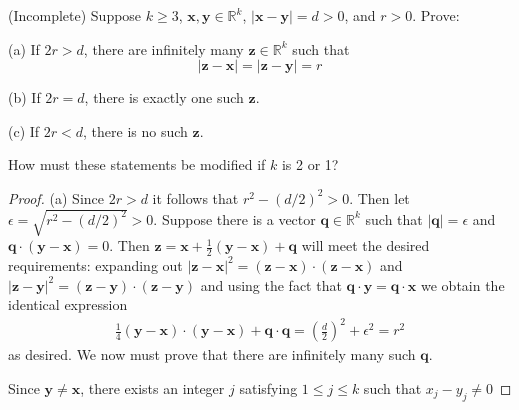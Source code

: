 \documentclass[12pt]{article}
\newenvironment{problem}[2][Problem]{\begin{trivlist}
\item[\hskip \labelsep {\bfseries #1}\hskip \labelsep {\bfseries #2.}]}{\end{trivlist}}
\begin{document}
\begin{problem}{9}

\end{problem}
\begin{problem}{10}

\end{problem}
\begin{problem}{11}

\end{problem}
\begin{problem}{12}

\end{problem}
\begin{problem}{13}

\end{problem}
\begin{problem}{14}

\end{problem}
\begin{problem}{15}

\end{problem}
\begin{problem}{16}
(Incomplete) Suppose $k \geq 3$, $\mathbf{x},\mathbf{y} \in \mathbb{R}^k$, $|\mathbf{x}-\mathbf{y}| = d > 0$, and $r > 0$.  Prove:

(a) If $2r > d$, there are infinitely many $\mathbf{z}\in \mathbb{R}^k$ such that
\begin{equation}
|\mathbf{z} - \mathbf{x}| = |\mathbf{z} - \mathbf{y}| = r
\end{equation}

(b) If $2r = d$, there is exactly one such $\mathbf{z}$.

(c) If $2r < d$, there is no such $\mathbf{z}$.

How must these statements be modified if $k$ is 2 or 1?
\end{problem}
\begin{proof}
(a) Since $2r > d$ it follows that $r^2 - (d/2)^2 > 0$.  Then let $\epsilon = \sqrt{r^2 - (d/2)^2} > 0$.  Suppose there is a vector $\mathbf{q} \in \mathbb{R}^k$ such that $|\mathbf{q}| = \epsilon$ and $\mathbf{q} \cdot (\mathbf{y} - \mathbf{x} )= 0$.  Then $\mathbf{z} = \mathbf{x} + \frac{1}{2}(\mathbf{y} - \mathbf{x}) + \mathbf{q}$ will meet the desired requirements: expanding out $|\mathbf{z} - \mathbf{x}|^2 = (\mathbf{z} - \mathbf{x}) \cdot (\mathbf{z} - \mathbf{x})$ and $|\mathbf{z} - \mathbf{y}|^2 = (\mathbf{z} - \mathbf{y}) \cdot (\mathbf{z} - \mathbf{y})$ and using the fact that $\mathbf{q}\cdot \mathbf{y} = \mathbf{q} \cdot \mathbf{x}$ we obtain the identical expression
\begin{align}
\frac{1}{4}(\mathbf{y} - \mathbf{x})\cdot (\mathbf{y} - \mathbf{x}) + \mathbf{q}\cdot \mathbf{q} = \left(\frac{d}{2}\right)^2 + \epsilon^2 = r^2
\end{align}
as desired.  We now must prove that there are infinitely many such $\mathbf{q}$.  

Since $\mathbf{y} \neq \mathbf{x}$, there exists an integer $j$ satisfying $1\leq j \leq k$ such that $x_j - y_j \neq 0$
\end{proof}
\end{document}
